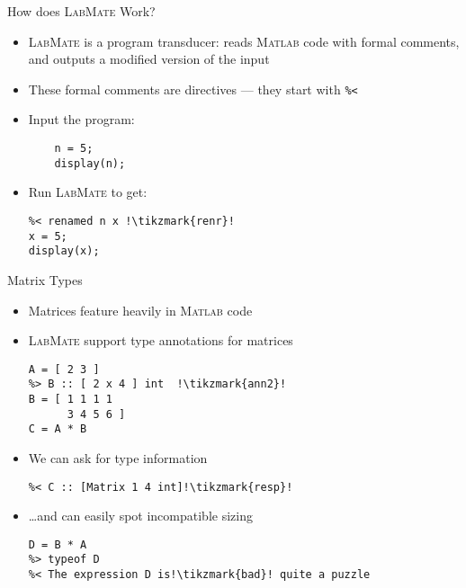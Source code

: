 \documentclass[]{beamer}
\newcommand{\tikzmark}[1]{\tikz[overlay,remember picture,baseline=-0.5ex] \node (#1) {};}
\newcommand{\lm}{\textsc{LabMate}\xspace}
\newcommand{\ma}{\textsc{Matlab}\xspace}
\begin{document}
\begin{frame}[fragile]{How does \lm Work?}
  \begin{itemize}
  \item \lm is a program transducer: reads \ma code with formal comments, and outputs a modified version of the input
  \item These formal comments are directives --- they start with \texttt{\%<}
  \item Input the program:
   \begin{lstlisting}[xleftmargin=2em]
    %> rename n x !\tikzmark{ren}!
    n = 5;
    display(n);
   \end{lstlisting}
  \pause
  \pause
\item Run \lm to get:
  \begin{lstlisting}[xleftmargin=2em]
%< LabMate 0.2.0.0 !\tikzmark{ver}!
%< renamed n x !\tikzmark{renr}!
x = 5;
display(x);
   \end{lstlisting}
  \pause
\end{itemize}
\end{frame}

\begin{frame}[fragile]{Matrix Types}
  \begin{itemize}[<+->]
  \item Matrices feature heavily in \ma code
  \item \lm support type annotations for matrices
\begin{lstlisting}[xleftmargin=0em, belowskip=-0.5em]
%> A :: [ 1 x 2 ] int  !\tikzmark{ann1}!
A = [ 2 3 ]
%> B :: [ 2 x 4 ] int  !\tikzmark{ann2}!
B = [ 1 1 1 1
      3 4 5 6 ]
C = A * B
\end{lstlisting}
  \pause
  \item We can ask for type information
\begin{lstlisting}[xleftmargin=0em, belowskip=-0.5em]
%> typeof C !\tikzmark{query}!
%< C :: [Matrix 1 4 int]!\tikzmark{resp}!
\end{lstlisting}
 \pause
  \item \ldots and can easily spot incompatible sizing
\begin{lstlisting}[xleftmargin=0em]
D = B * A
%> typeof D
%< The expression D is!\tikzmark{bad}! quite a puzzle
\end{lstlisting}
    \pause
\end{itemize}
\end{frame}
\end{document}

